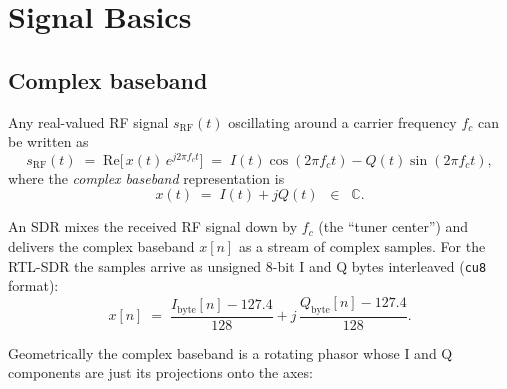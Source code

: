 \documentclass[11pt,a4paper]{article}
\begin{document}
\section{Signal Basics}

\subsection{Complex baseband}

Any real-valued RF signal $s_{\text{RF}}(t)$ oscillating around a carrier
frequency $f_c$ can be written as
\begin{equation}
s_{\text{RF}}(t) \;=\; \mathrm{Re}\bigl[\, x(t)\, e^{j 2\pi f_c t} \bigr]
                 \;=\; I(t)\cos(2\pi f_c t) - Q(t)\sin(2\pi f_c t),
\end{equation}
where the \emph{complex baseband} representation is
\begin{equation}
x(t) \;=\; I(t) + j Q(t) \;\;\in\;\; \mathbb{C}.
\end{equation}

An SDR mixes the received RF signal down by $f_c$ (the ``tuner center'')
and delivers the complex baseband $x[n]$ as a stream of complex samples.
For the RTL-SDR the samples arrive as unsigned 8-bit I and Q bytes
interleaved (\texttt{cu8} format):
\begin{equation}
x[n] \;=\; \frac{I_{\text{byte}}[n] - 127.4}{128}
        + j\,\frac{Q_{\text{byte}}[n] - 127.4}{128}.
\end{equation}

Geometrically the complex baseband is a rotating phasor whose I and Q
components are just its projections onto the axes:
\end{document}
